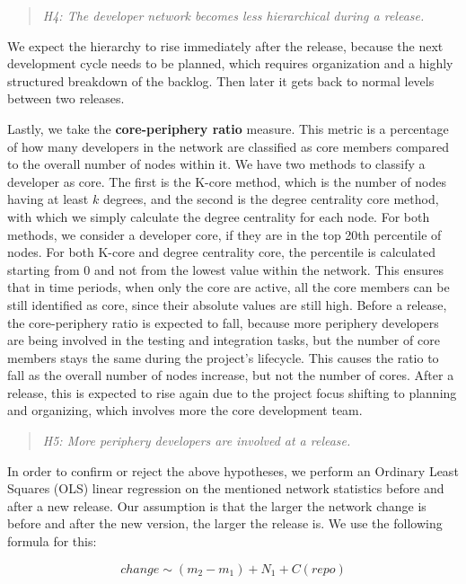 \begin{quote}
    \textit{H4: The developer network becomes less hierarchical during a release.}
\end{quote}

We expect the hierarchy to rise immediately after the release, because the next development cycle needs to be planned, which requires organization and a highly structured breakdown of the backlog. Then later it gets back to normal levels between two releases.

Lastly, we take the \textbf{core-periphery ratio} measure. This metric is a percentage of how many developers in the network are classified as core members compared to the overall number of nodes within it. We have two methods to classify a developer as core. The first is the K-core method, which is the number of nodes having at least $k$ degrees, and the second is the degree centrality core method, with which we simply calculate the degree centrality for each node. For both methods, we consider a developer core, if they are in the top 20th percentile of nodes. For both K-core and degree centrality core, the percentile is calculated starting from 0 and not from the lowest value within the network. This ensures that in time periods, when only the core are active, all the core members can be still identified as core, since their absolute values are still high. Before a release, the core-periphery ratio is expected to fall, because more periphery developers are being involved in the testing and integration tasks, but the number of core members stays the same during the project's lifecycle. This causes the ratio to fall as the overall number of nodes increase, but not the number of cores. After a release, this is expected to rise again due to the project focus shifting to planning and organizing, which involves more the core development team.

\begin{quote}
    \textit{H5: More periphery developers are involved at a release.}
\end{quote}

In order to confirm or reject the above hypotheses, we perform an Ordinary Least Squares (OLS) linear regression on the mentioned network statistics before and after a new release. Our assumption is that the larger the network change is before and after the new version, the larger the release is. We use the following formula for this:

 \[ change \sim (m_2 - m_1) + N_1 + C(repo) \]

